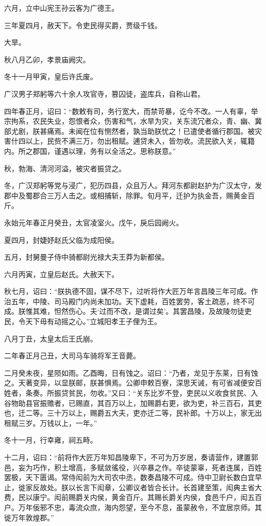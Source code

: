 \documentclass[]{article}
\begin{document}
六月，立中山宪王孙云客为广德王。

三年夏四月，赦天下。令吏民得买爵，贾级千钱。

大旱。

秋八月乙卯，孝景庙阙灾。

冬十一月甲寅，皇后许氏废。

广汉男子郑躬等六十余人攻官寺，篡囚徒，盗库兵，自称山君。

四年春正月，诏曰：``数敕有司，务行宽大，而禁苛暴，讫今不改。一人有辜，举宗拘系，农民失业，怨恨者众，伤害和气，水旱为灾，关东流冗者众，青、幽、冀部尤剧，朕甚痛焉。未闻在位有恻然者，孰当助朕忧之！已遣使者循行郡国。被灾害什四以上，民赀不满三万，勿出租赋。逋贷未入，皆勿收。流民欲入关，辄籍内。所之郡国，谨遇以理，务有以全活之。思称朕意。''

秋，勃海、清河河溢，被灾者振贷之。

冬，广汉郑躬等党与浸广，犯历四县，众且万人。拜河东都尉赵护为广汉太守，发郡中及蜀郡合三万人击之。或相捕斩，除罪。旬月平，迁护为执金吾，赐黄金百斤。

永始元年春正月癸丑，太官凌室火。戊午，戾后园阙火。

夏四月，封婕妤赵氏父临为成阳侯。

五月，封舅曼子侍中骑都尉光禄大夫王莽为新都侯。

六月丙寅，立皇后赵氏。大赦天下。

秋七月，诏曰：``朕执德不固，谋不尽下，过听将作大匠万年言昌陵三年可成。作治五年，中陵、司马殿门内尚未加功。天下虚耗，百姓罢劳，客土疏恶，终不可成。朕惟其难，怛然伤心。夫`过而不改，是谓过矣'。其罢昌陵，及故陵勿徒吏民，令天下毋有动摇之心。''立城阳孝王子俚为王。

八月丁丑，太皇太后王氏崩。

二年春正月己丑，大司马车骑将军王音薨。

二月癸未夜，星陨如雨。乙酉晦，日有蚀之。诏曰：``乃者，龙见于东莱，日有蚀之。天著变异，以显朕邮，朕甚惧焉。公卿申敕百寮，深思天诫，有可省减便安百姓者，条奏。所振贷贫民，勿收。''又曰：``关东比岁不登，吏民以义收食贫民、入谷物助县官振赡者，已赐直，其百万以上，加赐爵右更，欲为吏，补三百石，其吏也，迁二等。三十万以上，赐爵五大夫，吏亦迁二等，民补郎。十万以上，家无出租赋三岁。万钱以上，一年。''

冬十一月，行幸雍，祠五畤。

十二月，诏曰：``前将作大匠万年知昌陵卑下，不可为万岁居，奏请营作，建置郭邑，妄为巧作，积土增高，多赋敛徭役，兴卒暴之作。卒徒蒙辜，死者连属，百姓罢极，天下匮谒。常侍闳前为大司农中丞，数奏昌陵不可成。侍中卫尉长数白宜早止，徙家反故处。朕以长言下闳章，公卿议者皆合长计。长首建至策，闳典主省大费，民以康宁。闳前赐爵关内侯，黄金百斤。其赐长爵关内侯，食邑千户，闳五百户。万年佞邪不忠，毒流众庶，海内怨望，至今不息，虽蒙赦令，不宜居京师。其徙万年敦煌郡。''
\end{document}

